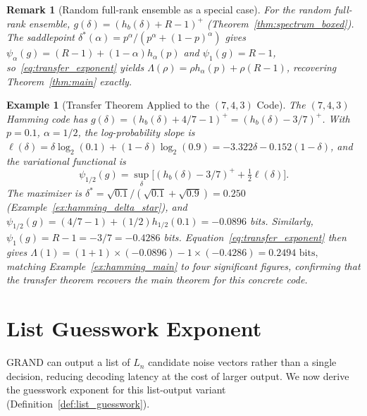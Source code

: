 \documentclass[journal,10pt,onecolumn]{IEEEtran}
\newtheorem{remark}{Remark}
\newtheorem{example}{Example}
\newcommand{\Hb}{h_b}
\begin{document}
\begin{remark}[Random full-rank ensemble as a special case]
For the random full-rank ensemble, $g(\delta)=(\Hb(\delta)+R-1)^+$
(Theorem~\ref{thm:spectrum_boxed}).
The saddlepoint $\delta^*(\alpha)=p^\alpha/(p^\alpha+(1-p)^\alpha)$
gives $\psi_\alpha(g)=(R-1)+(1-\alpha)h_\alpha(p)$
and $\psi_1(g)=R-1$,
so~\eqref{eq:transfer_exponent} yields
$\Lambda(\rho)=\rho h_\alpha(p)+\rho(R-1)$,
recovering Theorem~\ref{thm:main} exactly.
\end{remark}


\begin{example}[Transfer Theorem Applied to the $(7,4,3)$ Code]
\label{ex:hamming_transfer}
The $(7,4,3)$ Hamming code has $g(\delta)=(\Hb(\delta)+4/7-1)^+
=(\Hb(\delta)-3/7)^+$.
With $p=0.1$, $\alpha=1/2$, the log-probability slope is
$\ell(\delta)=\delta\log_2(0.1)+(1-\delta)\log_2(0.9)
 = -3.322\delta-0.152(1-\delta)$,
and the variational functional is
\[
\psi_{1/2}(g)=\sup_\delta\bigl[(\Hb(\delta)-3/7)^+
+\tfrac{1}{2}\ell(\delta)\bigr].
\]
The maximizer is $\delta^*=\sqrt{0.1}/(\sqrt{0.1}+\sqrt{0.9})
 = 0.250$ (Example~\ref{ex:hamming_delta_star}), and
$\psi_{1/2}(g)=(4/7-1)+(1/2)h_{1/2}(0.1)=-0.0896$ bits.
Similarly, $\psi_1(g)=R-1=-3/7 = -0.4286$ bits.
Equation~\eqref{eq:transfer_exponent} then gives
\(
\Lambda(1)=(1+1)\times(-0.0896)-1\times(-0.4286)
=0.2494\text{ bits},
\)
matching Example~\ref{ex:hamming_main} to four significant figures,
confirming that the transfer theorem recovers the main theorem
for this concrete code.
\end{example}



\section{List Guesswork Exponent}
\label{sec:list}

GRAND can output a list of $L_n$ candidate noise vectors rather than
a single decision, reducing decoding latency at the cost of larger
output.  We now derive the guesswork exponent for this list-output
variant (Definition~\ref{def:list_guesswork}).
\end{document}
